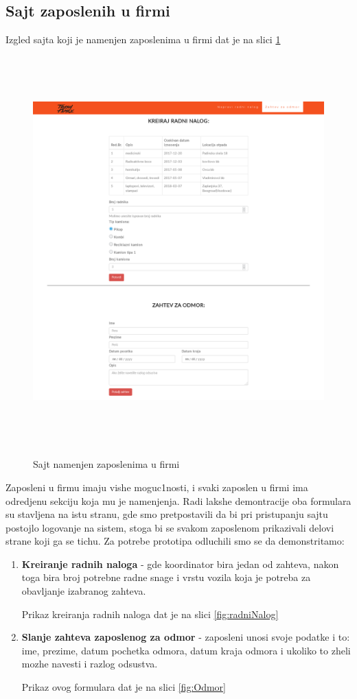 \documentclass[10 pt]{article}
\begin{document}
	\newpage
	\subsection{Sajt zaposlenih u firmi}
	
	Izgled sajta koji je namenjen zaposlenima u firmi dat je na slici \ref{fig:StranaZaposlenih}	
	
		\begin{figure}[H]
			\centering
			\includegraphics[width=15cm,height=15cm,keepaspectratio]{GUI/stranaFirme.png}\\
			\caption{Sajt namenjen zaposlenima u firmi}
			\label{fig:StranaZaposlenih}
		\end{figure}
	
	Zaposleni u firmu imaju vishe moguc1nosti, i svaki zaposlen u firmi ima odredjenu sekciju koja mu je namenjenja. Radi lakshe demontracije oba formulara su stavljena na istu stranu, gde smo pretpostavili da bi pri pristupanju sajtu postojlo logovanje na sistem, stoga bi se svakom zaposlenom prikazivali delovi strane koji ga se tichu. Za potrebe prototipa odluchili smo se da demonstritamo:
		\begin{enumerate}
			\item \textbf{Kreiranje radnih naloga} - gde koordinator bira jedan od zahteva, nakon toga bira broj potrebne radne snage i vrstu vozila koja je potreba za obavljanje izabranog zahteva.
			
			Prikaz kreiranja radnih naloga dat je na slici \ref{fig:radniNalog}
			
			\item \textbf{Slanje zahteva zaposlenog za odmor} - zaposleni unosi svoje podatke i to: ime, prezime, datum pochetka odmora, datum kraja odmora i ukoliko to zheli mozhe navesti i razlog odsustva.
			
			Prikaz ovog formulara dat je na slici \ref{fig:Odmor}
		\end{enumerate}
	
\end{document}
